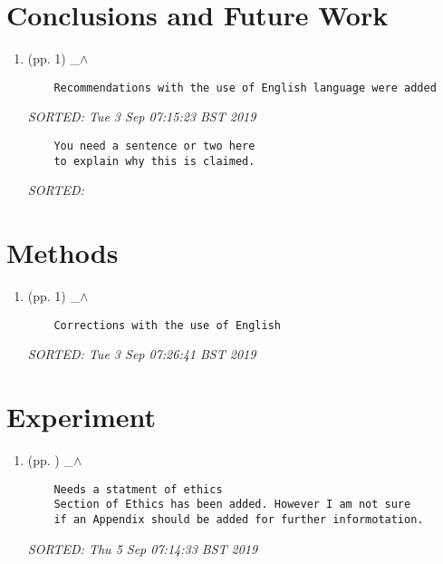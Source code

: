 \documentclass[12pt]{article}
\begin{document}
\section{Conclusions and Future Work}


\begin{enumerate}

\item  (pp. 1)  \_$\wedge$  

	\begin{verbatim}
	Recommendations with the use of English language were added	
	\end{verbatim}
	\textit{
	SORTED:  Tue  3 Sep 07:15:23 BST 2019
	}
	\\

	\begin{verbatim}
	You need a sentence or two here
	to explain why this is claimed.
	\end{verbatim}
	\textit{
	SORTED:  
	}
	\\




\end{enumerate}




\section{Methods}


\begin{enumerate}

\item  (pp. 1)  \_$\wedge$  

	\begin{verbatim}
	Corrections with the use of English	
	\end{verbatim}
	\textit{
	SORTED:  Tue  3 Sep 07:26:41 BST 2019
	}
	\\


\end{enumerate}







\section{Experiment}


\begin{enumerate}

\item  (pp. )  \_$\wedge$  

	\begin{verbatim}
	Needs a statment of ethics 
	Section of Ethics has been added. However I am not sure 
	if an Appendix should be added for further informotation.
	\end{verbatim}
	\textit{
	SORTED:  Thu  5 Sep 07:14:33 BST 2019
	}
	\\


\end{enumerate}
\end{document}

